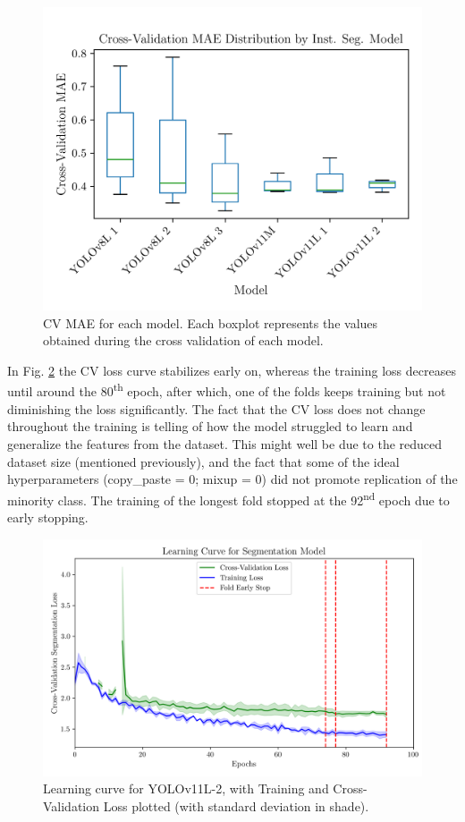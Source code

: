 \documentclass[conference]{IEEEtran}
\begin{document}
\begin{figure}[H]
    \centering
    \includegraphics[width=1\linewidth]{assets/model02_mae_boxplot.png}
    \caption{CV MAE for each model. Each boxplot represents the values obtained during the cross validation of each model.}
    \label{fig:model02_mae_boxplot}
\end{figure}

In Fig. \ref{fig:model02_lc} the CV loss curve stabilizes early on, whereas the training loss decreases until around the 80\textsuperscript{th} epoch, after which, one of the folds keeps training but not diminishing the loss significantly. The fact that the CV loss does not change throughout the training is telling of how the model struggled to learn and generalize the features from the dataset. This might well be due to the reduced dataset size (mentioned previously), and the fact that some of the ideal hyperparameters (copy\_paste = 0; mixup = 0) did not promote replication of the minority class. The training of the longest fold stopped at the 92\textsuperscript{nd} epoch due to early stopping.

\begin{figure}[H]
    \centering
    \includegraphics[width=1\linewidth]{assets/model02_lc.png}
    \caption{Learning curve for YOLOv11L-2, with Training and Cross-Validation Loss plotted (with standard deviation in
shade).}
    \label{fig:model02_lc}
\end{figure}
\end{document}
